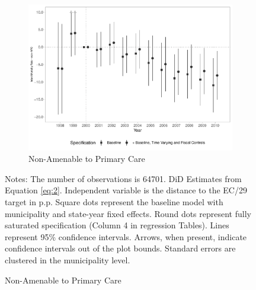 \begin{figure}[h!]
\begin{center}
    \begin{subfigure}{0.32\textwidth}
        \centering
        \caption{\scriptsize Non-Amenable to Primary Care}\label{fig:16c}
        \includegraphics[width=\textwidth]{plots/tx_mi_nicsap_dist_ec29_baseline_dist_ec29_baseline_16.pdf}
    \end{subfigure}
    
    \end{center}
    
        \scriptsize{Notes: The number of observations is 64701. DiD Estimates from Equation \ref{eq:2}. Independent variable is the distance to the EC/29 target in p.p. Square dots represent the baseline model with municipality and state-year fixed effects. Round dots represent fully saturated specification (Column 4 in regression Tables). Lines represent 95\% confidence intervals. Arrows, when present, indicate confidence intervals out of the plot bounds. Standard errors are clustered in the municipality level.}
    
\end{figure}